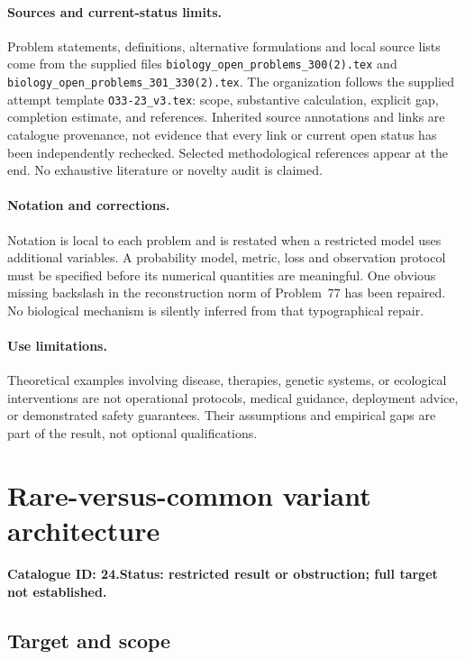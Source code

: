 \documentclass[11pt]{article}
\begin{document}
\paragraph{Sources and current-status limits.}
Problem statements, definitions, alternative formulations and local source lists
come from the supplied files
\texttt{biology\_open\_problems\_300(2).tex} and
\texttt{biology\_open\_problems\_301\_330(2).tex}.
The organization follows the supplied attempt template
\texttt{O33-23\_v3.tex}: scope, substantive calculation, explicit gap,
completion estimate, and references. Inherited source annotations and links are
catalogue provenance, not evidence that every link or current open status has
been independently rechecked. Selected methodological references appear at the
end. No exhaustive literature or novelty audit is claimed.

\paragraph{Notation and corrections.}
Notation is local to each problem and is restated when a restricted model uses
additional variables. A probability model, metric, loss and observation protocol
must be specified before its numerical quantities are meaningful. One obvious
missing backslash in the reconstruction norm of Problem~77 has been repaired.
No biological mechanism is silently inferred from that typographical repair.

\paragraph{Use limitations.}
Theoretical examples involving disease, therapies, genetic systems, or ecological
interventions are not operational protocols, medical guidance, deployment advice,
or demonstrated safety guarantees. Their assumptions and empirical gaps are part
of the result, not optional qualifications.

\setcounter{section}{23}
\section{Rare-versus-common variant architecture}
\label{prob:024}
\noindent\textbf{Catalogue ID: 24.}\quad \textbf{Status: restricted result or obstruction; full target not established.}
\subsection{Target and scope}
\end{document}
